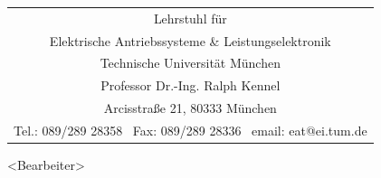 \newpage

\mbox{}

\thispagestyle{empty}

\newpage

\thispagestyle{empty}

\begin{center}\begin{tabular}{c}
{\Large Lehrstuhl für}  \tabularnewline
{\Large Elektrische Antriebssysteme \& Leistungselektronik} \tabularnewline
{\large Technische Universität München}\tabularnewline
{\large Professor Dr.-Ing. Ralph Kennel}\tabularnewline
{\small Arcisstraße 21, 80333 München}\tabularnewline
{\scriptsize Tel.: 089/289 28358\hspace{1cm} ~Fax: 089/289 28336
\hspace{1cm} ~email: eat@ei.tum.de}\tabularnewline
\hline
\end{tabular}\par\end{center}

\begin{center}\vspace*{2.0cm} \par\end{center}

\begin{center}{\large <Bearbeiter>}\par\end{center}{\large \par}

\vspace*{1.0cm}

\begin{center}{}\par\end{center}{\huge \par}

\begin{center}\newpage

\mbox{}

\thispagestyle{empty}\par\end{center}

\newpage

\thispagestyle{empty}

\begin{center}{}\par\end{center}{\LARGE \par}

